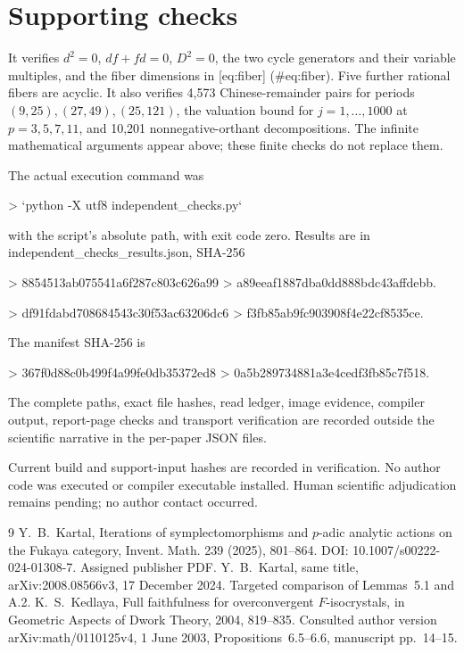 \documentclass[10pt]{article}
\begin{document}
\section*{Supporting checks}
It verifies \(d^2=0\), \(df+fd=0\), \(D^2=0\), the two cycle generators and their variable multiples, and the fiber dimensions in [eq:fiber] (\#eq:fiber). Five further rational fibers are acyclic. It also verifies 4,573 Chinese-remainder pairs for periods \((9,25),(27,49),(25,121)\), the valuation bound for \(j=1,\ldots,1000\) at \(p=3,5,7,11\), and 10,201 nonnegative-orthant decompositions. The infinite mathematical arguments appear above; these finite checks do not replace them.\par
The actual execution command was\par
> `python -X utf8 independent\_checks.py`\par
with the script’s absolute path, with exit code zero. Results are in independent\_checks\_results.json, SHA-256\par
> 8854513ab075541a6f287c803c626a99
> a89eeaf1887dba0dd888bdc43affdebb.\par
> df91fdabd708684543c30f53ac63206dc6
> f3fb85ab9fc903908f4e22cf8535ce.\par
The manifest SHA-256 is\par
> 367f0d88c0b499f4a99fe0db35372ed8
> 0a5b289734881a3e4cedf3fb85c7f518.\par
The complete paths, exact file hashes, read ledger, image evidence, compiler output, report-page checks and transport verification are recorded outside the scientific narrative in the per-paper JSON files.\par
Current build and support-input hashes are recorded in verification. No author code was executed or compiler executable installed. Human scientific adjudication remains pending; no author contact occurred.\par
9 Y. B. Kartal, Iterations of symplectomorphisms and \(p\)-adic analytic actions on the Fukaya category, Invent. Math. 239 (2025), 801–864. DOI: 10.1007/s00222-024-01308-7. Assigned publisher PDF. Y. B. Kartal, same title, arXiv:2008.08566v3, 17 December 2024. Targeted comparison of Lemmas 5.1 and A.2. K. S. Kedlaya, Full faithfulness for overconvergent \(F\)-isocrystals, in Geometric Aspects of Dwork Theory, 2004, 819–835. Consulted author version arXiv:math/0110125v4, 1 June 2003, Propositions 6.5–6.6, manuscript pp. 14–15.\par
\end{document}

